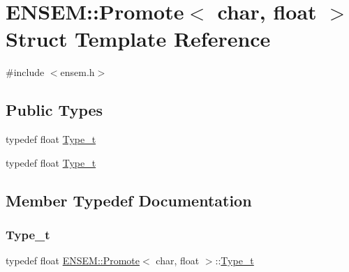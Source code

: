 \hypertarget{structENSEM_1_1Promote_3_01char_00_01float_01_4}{}\section{E\+N\+S\+EM\+:\+:Promote$<$ char, float $>$ Struct Template Reference}
\label{structENSEM_1_1Promote_3_01char_00_01float_01_4}


{\ttfamily \#include $<$ensem.\+h$>$}

\subsection*{Public Types}
\begin{DoxyCompactItemize}
\item 
typedef float \mbox{\hyperlink{structENSEM_1_1Promote_3_01char_00_01float_01_4_ab888f85116b883e8bcc31eb0c1a7a6da}{Type\+\_\+t}}
\item 
typedef float \mbox{\hyperlink{structENSEM_1_1Promote_3_01char_00_01float_01_4_ab888f85116b883e8bcc31eb0c1a7a6da}{Type\+\_\+t}}
\end{DoxyCompactItemize}


\subsection{Member Typedef Documentation}
\mbox{\label{structENSEM_1_1Promote_3_01char_00_01float_01_4_ab888f85116b883e8bcc31eb0c1a7a6da}} 
\subsubsection{\texorpdfstring{Type\_t}{Type\_t}\hspace{0.1cm}{\footnotesize\ttfamily [1/2]}}
{\footnotesize\ttfamily typedef float \mbox{\hyperlink{structENSEM_1_1Promote}{E\+N\+S\+E\+M\+::\+Promote}}$<$ char, float $>$\+::\mbox{\hyperlink{structENSEM_1_1Promote_3_01char_00_01float_01_4_ab888f85116b883e8bcc31eb0c1a7a6da}{Type\+\_\+t}}}

\mbox{\label{structENSEM_1_1Promote_3_01char_00_01float_01_4_ab888f85116b883e8bcc31eb0c1a7a6da}} 
